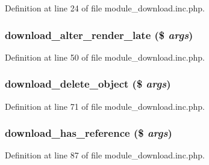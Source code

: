 Definition at line 24 of file module\_\-download.inc.php.

\hypertarget{module__download_8inc_8php_a61a6050abc43cf71d0ca422a9240ae7c}{
\subsubsection[{download\_\-alter\_\-render\_\-late}]{\setlength{\rightskip}{0pt plus 5cm}download\_\-alter\_\-render\_\-late (\$ {\em args})}}
\label{module__download_8inc_8php_a61a6050abc43cf71d0ca422a9240ae7c}


Definition at line 50 of file module\_\-download.inc.php.

\hypertarget{module__download_8inc_8php_a5fd781bf1e0393667b227abec7169b28}{
\subsubsection[{download\_\-delete\_\-object}]{\setlength{\rightskip}{0pt plus 5cm}download\_\-delete\_\-object (\$ {\em args})}}
\label{module__download_8inc_8php_a5fd781bf1e0393667b227abec7169b28}


Definition at line 71 of file module\_\-download.inc.php.

\hypertarget{module__download_8inc_8php_aa80da3f3fd41f7f00f97043f7a2431c8}{
\subsubsection[{download\_\-has\_\-reference}]{\setlength{\rightskip}{0pt plus 5cm}download\_\-has\_\-reference (\$ {\em args})}}
\label{module__download_8inc_8php_aa80da3f3fd41f7f00f97043f7a2431c8}


Definition at line 87 of file module\_\-download.inc.php.

